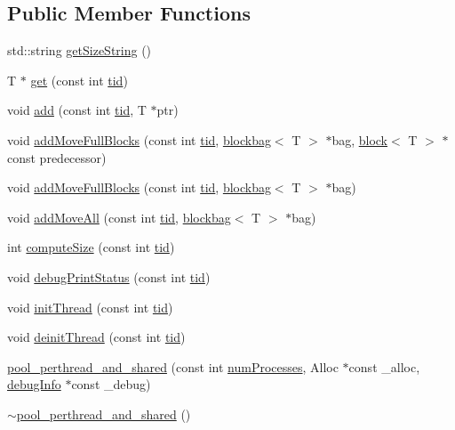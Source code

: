 \subsection*{Public Member Functions}
\begin{DoxyCompactItemize}
\item 
std\+::string \hyperlink{classpool__perthread__and__shared_a25687267084000ddc8c08fcf5fd783d6}{get\+Size\+String} ()
\item 
T $\ast$ \hyperlink{classpool__perthread__and__shared_ad52113553f51867ba3db6a882e5a32bb}{get} (const int \hyperlink{microbench_2main_8cpp_a9ca9869868fe7e7a38a921cc7de4103f}{tid})
\item 
void \hyperlink{classpool__perthread__and__shared_a578633fa1ef9648a47451441abaaf2fe}{add} (const int \hyperlink{microbench_2main_8cpp_a9ca9869868fe7e7a38a921cc7de4103f}{tid}, T $\ast$ptr)
\item 
void \hyperlink{classpool__perthread__and__shared_ae1e35a34657e432e02b4025ed9206add}{add\+Move\+Full\+Blocks} (const int \hyperlink{microbench_2main_8cpp_a9ca9869868fe7e7a38a921cc7de4103f}{tid}, \hyperlink{classblockbag}{blockbag}$<$ T $>$ $\ast$bag, \hyperlink{classblock}{block}$<$ T $>$ $\ast$const predecessor)
\item 
void \hyperlink{classpool__perthread__and__shared_a4c7dfae20a74fd041289497cec1d00a2}{add\+Move\+Full\+Blocks} (const int \hyperlink{microbench_2main_8cpp_a9ca9869868fe7e7a38a921cc7de4103f}{tid}, \hyperlink{classblockbag}{blockbag}$<$ T $>$ $\ast$bag)
\item 
void \hyperlink{classpool__perthread__and__shared_a3337f390a8739b621271a54c1233c470}{add\+Move\+All} (const int \hyperlink{microbench_2main_8cpp_a9ca9869868fe7e7a38a921cc7de4103f}{tid}, \hyperlink{classblockbag}{blockbag}$<$ T $>$ $\ast$bag)
\item 
int \hyperlink{classpool__perthread__and__shared_ae394f1c5a151a8c3154b0d94d4164449}{compute\+Size} (const int \hyperlink{microbench_2main_8cpp_a9ca9869868fe7e7a38a921cc7de4103f}{tid})
\item 
void \hyperlink{classpool__perthread__and__shared_a31df0438be41883ffcc4addfb6686579}{debug\+Print\+Status} (const int \hyperlink{microbench_2main_8cpp_a9ca9869868fe7e7a38a921cc7de4103f}{tid})
\item 
void \hyperlink{classpool__perthread__and__shared_a672fc4d4dce0b8f4f2418faf9e20b66e}{init\+Thread} (const int \hyperlink{microbench_2main_8cpp_a9ca9869868fe7e7a38a921cc7de4103f}{tid})
\item 
void \hyperlink{classpool__perthread__and__shared_a3a48ef748d4e73fb2c01b608d18fb56f}{deinit\+Thread} (const int \hyperlink{microbench_2main_8cpp_a9ca9869868fe7e7a38a921cc7de4103f}{tid})
\item 
\hyperlink{classpool__perthread__and__shared_a4a8df3a988491203b1c10254a7d7aad9}{pool\+\_\+perthread\+\_\+and\+\_\+shared} (const int \hyperlink{testing_8cpp_aa085812188e21ede75351d88b9b2c30d}{num\+Processes}, Alloc $\ast$const \+\_\+alloc, \hyperlink{classdebugInfo}{debug\+Info} $\ast$const \+\_\+debug)
\item 
\hyperlink{classpool__perthread__and__shared_adcc308cffe32f83cb930002eeb059a67}{$\sim$pool\+\_\+perthread\+\_\+and\+\_\+shared} ()
\end{DoxyCompactItemize}
